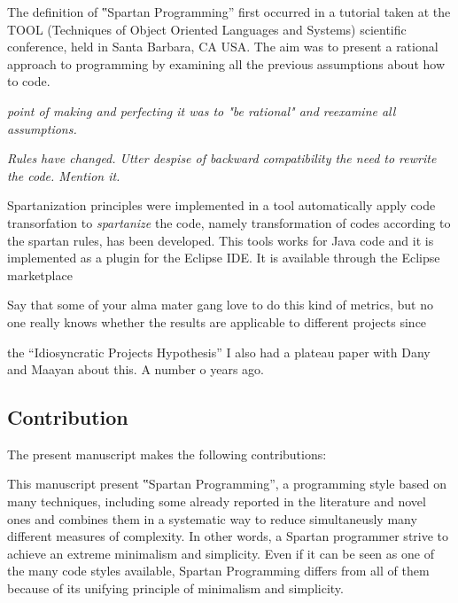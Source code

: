 
The definition of ‟Spartan Programming” first occurred in a tutorial taken at
the TOOL (Techniques of Object Oriented Languages and Systems) scientific conference,
held in Santa Barbara, CA USA. %
The aim was to present a rational approach to programming by examining all the previous
assumptions about how to code.

\emph{point of making and perfecting it was to "be rational" and
reexamine all assumptions.}

\emph{Rules have changed.
Utter despise of backward compatibility the need to rewrite the code.
Mention it.}


Spartanization principles were implemented in a tool automatically apply code transorfation
to \emph{spartanize} the code, namely transformation of codes according to the spartan rules, has been developed.
This tools works for Java code and it is implemented as a plugin for the Eclipse
IDE\@. It is available through the Eclipse marketplace

Say that some of your alma mater gang love to do this kind of metrics, but
no one really knows whether the results are applicable to different projects
since~\cite{Turnu:Concas:Marchesi:Tonelli:11}

the ``Idiosyncratic Projects Hypothesis'' I also had a plateau paper with
Dany and Maayan about this. A number o years ago.\cite{Gil:2011:Goldstein:Moshkovich:2011}

\subsection{Contribution}

The present manuscript makes the following contributions:

This manuscript present ‟Spartan Programming”, a programming style based on many techniques,
including some already reported in the literature and novel ones and combines them
in a systematic way to reduce simultaneusly many different measures of complexity.
In other words, a Spartan programmer strive to achieve an extreme minimalism and simplicity.
Even if it can be seen as one of the many code styles available, Spartan Programming differs from
all of them because of its unifying principle of minimalism and simplicity.


